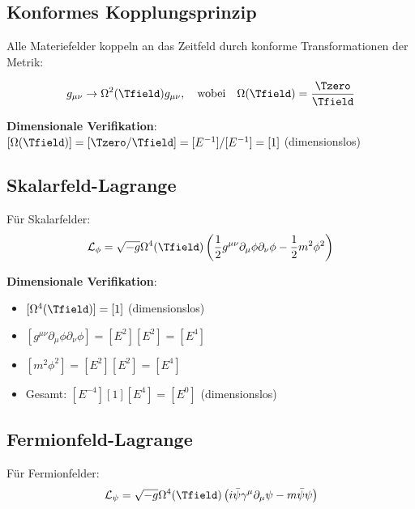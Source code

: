 	\subsection{Konformes Kopplungsprinzip}
	\label{subsec:konformes_kopplungsprinzip}
	
	Alle Materiefelder koppeln an das Zeitfeld durch konforme Transformationen der Metrik:
	
	\begin{equation}
		g_{\mu\nu} \to \Omega^2(\Tfield) g_{\mu\nu}, \quad \text{wobei} \quad \Omega(\Tfield) = \frac{\Tzero}{\Tfield}
		\label{eq:konforme_transformation}
	\end{equation}
	
	\textbf{Dimensionale Verifikation}: $[\Omega(\Tfield)] = [\Tzero/\Tfield] = [E^{-1}]/[E^{-1}] = [1]$ (dimensionslos) \checkmark
	
	\subsection{Skalarfeld-Lagrange}
	\label{subsec:skalarfeld_lagrange}
	
	Für Skalarfelder:
	\begin{equation}
		\mathcal{L}_\phi = \sqrt{-g} \Omega^4(\Tfield) \left(\frac{1}{2} g^{\mu\nu} \partial_\mu \phi \partial_\nu \phi - \frac{1}{2} m^2 \phi^2\right)
		\label{eq:skalar_lagrange}
	\end{equation}
	
	\textbf{Dimensionale Verifikation}:
	\begin{itemize}
		\item $[\Omega^4(\Tfield)] = [1]$ (dimensionslos)
		\item $[g^{\mu\nu} \partial_\mu \phi \partial_\nu \phi] = [E^2][E^2] = [E^4]$
		\item $[m^2 \phi^2] = [E^2][E^2] = [E^4]$
		\item Gesamt: $[E^{-4}][1][E^4] = [E^0]$ (dimensionslos) \checkmark
	\end{itemize}
	
	\subsection{Fermionfeld-Lagrange}
	\label{subsec:fermionfeld_lagrange}
	
	Für Fermionfelder:
	\begin{equation}
		\mathcal{L}_\psi = \sqrt{-g} \Omega^4(\Tfield) \left(i\bar{\psi}\gamma^\mu\partial_\mu\psi - m\bar{\psi}\psi\right)
		\label{eq:fermion_lagrange}
	\end{equation}
	

